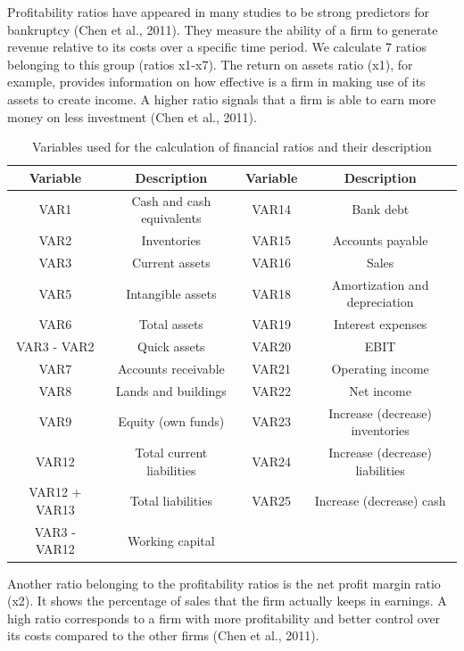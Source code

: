 \documentclass{article}
\begin{document}
Profitability ratios have appeared in many studies to be strong predictors for bankruptcy (Chen et al., 2011). They measure the ability of a firm to generate revenue relative to its costs over a specific time period. We calculate 7 ratios belonging to this group (ratios x1-x7). The return on assets ratio (x1), for example, provides information on how effective is a firm in making use of its assets to create income. A higher ratio signals that a firm is able to earn more money on less investment (Chen et al., 2011). 

\begin{table}
\begin{center}
\caption{Variables used for the calculation of financial ratios and their description}
\footnotesize
\begin{tabular}{cccc} 
\hline\hline
Variable  & Description & Variable & Description\\ 
\hline
VAR1 & Cash and cash equivalents & VAR14 & Bank debt\\
VAR2 & Inventories & VAR15 & Accounts payable\\
VAR3 & Current assets & VAR16 & Sales\\ 
VAR5 & Intangible assets & VAR18 & Amortization and depreciation\\
VAR6 & Total assets & VAR19 & Interest expenses\\
VAR3 - VAR2 & Quick assets & VAR20 & EBIT\\
VAR7 & Accounts receivable & VAR21 & Operating income\\
VAR8 & Lands and buildings & VAR22 & Net income\\
VAR9 & Equity (own funds) & VAR23 & Increase (decrease) inventories\\
VAR12 & Total current liabilities & VAR24 & Increase (decrease) liabilities\\
VAR12 + VAR13 & Total liabilities & VAR25 & Increase (decrease) cash\\
VAR3 - VAR12 & Working capital & &\\ 
\hline\hline
\end{tabular}
\end{center}
\end{table}

Another ratio belonging to the profitability ratios is the net profit margin ratio (x2). It shows the percentage of sales that the firm actually keeps in earnings. A high ratio corresponds to a firm with more profitability and better control over its costs compared to the other firms (Chen et al., 2011).  
 
\end{document}
